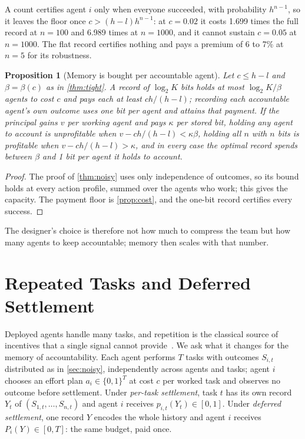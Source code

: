 \documentclass[sigconf,anonymous,acmthm=false]{aamas}
\theoremstyle{acmplain}
\newtheorem{proposition}{Proposition}
\theoremstyle{acmdefinition}
\newcommand{\cube}{\{0,1\}}
\begin{document}
A count certifies agent $i$ only when everyone succeeded, with probability $h^{n-1}$, so it
leaves the floor once $c>(h-l)h^{n-1}$: at $c=0.02$ it costs 1.699 times the full record at
$n=100$ and 6.989 times at $n=1000$, and it cannot sustain $c=0.05$ at $n=1000$. The flat
record certifies nothing and pays a premium of 6 to 7\% at $n=5$ for its robustness.

\begin{proposition}[Memory is bought per accountable agent]\label{prop:designer}
Let $c\le h-l$ and $\beta=\beta(c)$ as in \cref{thm:tight}. A record of $\log_2K$
bits holds at most $\log_2K/\beta$ agents to cost $c$ and pays each at least $ch/(h-l)$;
recording each accountable agent's own outcome uses one bit per agent and attains that
payment. If the principal gains $v$ per working agent and pays $\kappa$ per stored bit,
holding any agent to account is unprofitable when $v-ch/(h-l)<\kappa\beta$, holding all $n$
with $n$ bits is profitable when $v-ch/(h-l)>\kappa$, and in every case the optimal record
spends between $\beta$ and 1 bit per agent it holds to account.
\end{proposition}
\begin{proof}
The proof of \cref{thm:noisy} uses only independence of outcomes, so its bound holds at every
action profile, summed over the agents who work; this gives the capacity. The payment floor
is \cref{prop:cost}, and the one-bit record certifies every success.
\end{proof}

The designer's choice is therefore not how much to compress the team but how many agents to
keep accountable; memory then scales with that number.

\section{Repeated Tasks and Deferred Settlement}\label{sec:repeated}

Deployed agents handle many tasks, and repetition is the classical source of incentives that
a single signal cannot provide~\cite{radner1985repeated,jacksonsonnenschein2007}. We ask what
it changes for the memory of accountability. Each agent performs $T$ tasks with outcomes
$S_{i,t}$ distributed as in \cref{sec:noisy}, independently across agents and tasks; agent $i$
chooses an effort plan $a_i\in\cube^T$ at cost $c$ per worked task and observes no outcome
before settlement. Under \emph{per-task settlement}, task $t$ has its own record $Y_t$ of
$(S_{1,t},\dots,S_{n,t})$ and agent $i$ receives $p_{i,t}(Y_t)\in[0,1]$. Under \emph{deferred
settlement}, one record $Y$ encodes the whole history and agent $i$ receives
$P_i(Y)\in[0,T]$: the same budget, paid once.
\end{document}
